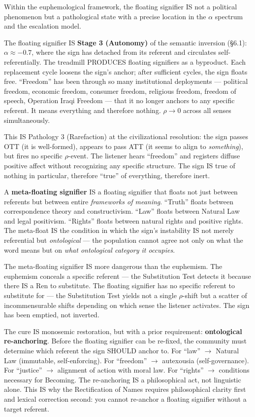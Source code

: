 \documentclass[11pt, oneside]{article}
\theoremstyle{definition}
\begin{document}
Within the euphemological framework, the floating signifier IS not a political phenomenon but a pathological state with a precise location in the $\alpha$ spectrum and the escalation model.

The floating signifier IS \textbf{Stage 3 (Autonomy)} of the semantic inversion (\S6.1): $\alpha \approx -0.7$, where the sign has detached from its referent and circulates self-referentially. The treadmill PRODUCES floating signifiers as a byproduct. Each replacement cycle loosens the sign's anchor; after sufficient cycles, the sign floats free. ``Freedom'' has been through so many institutional deployments --- political freedom, economic freedom, consumer freedom, religious freedom, freedom of speech, Operation Iraqi Freedom --- that it no longer anchors to any specific referent. It means everything and therefore nothing. $\rho \to 0$ across all senses simultaneously.

This IS Pathology 3 (Rarefaction) at the civilizational resolution: the sign passes OTT (it is well-formed), appears to pass ATT (it seems to align to \textit{something}), but fires no specific $\rho$-event. The listener hears ``freedom'' and registers diffuse positive affect without recognizing any specific structure. The sign IS true of nothing in particular, therefore ``true'' of everything, therefore inert.

A \textbf{meta-floating signifier} IS a floating signifier that floats not just between referents but between entire \textit{frameworks of meaning}. ``Truth'' floats between correspondence theory and constructivism. ``Law'' floats between Natural Law and legal positivism. ``Rights'' floats between natural rights and positive rights. The meta-float IS the condition in which the sign's instability IS not merely referential but \textit{ontological} --- the population cannot agree not only on what the word means but on \textit{what ontological category it occupies}.

The meta-floating signifier IS more dangerous than the euphemism. The euphemism conceals a specific referent --- the Substitution Test detects it because there IS a Ren to substitute. The floating signifier has no specific referent to substitute for --- the Substitution Test yields not a single $\rho$-shift but a scatter of incommensurable shifts depending on which sense the listener activates. The sign has been emptied, not inverted.

The cure IS monosemic restoration, but with a prior requirement: \textbf{ontological re-anchoring}. Before the floating signifier can be re-fixed, the community must determine which referent the sign SHOULD anchor to. For ``law'' $\to$ Natural Law (immutable, self-enforcing). For ``freedom'' $\to$ autexousia (self-governance). For ``justice'' $\to$ alignment of action with moral law. For ``rights'' $\to$ conditions necessary for Becoming. The re-anchoring IS a philosophical act, not linguistic alone. This IS why the Rectification of Names requires philosophical clarity first and lexical correction second: you cannot re-anchor a floating signifier without a target referent.
\end{document}

